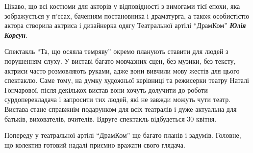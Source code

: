 Цікаво, що всі костюми для акторів у відповідності з вимогами тієї епохи, яка
зображується у п'єсах, баченням постановника і драматурга, а також особистістю
актора створила актриса і дизайнерка одягу Театральної артілі \enquote{ДрамКом} \textbf{\emph{Юлія
Корсун}}.


Спектакль \enquote{Та, що осяяла темряву} окремо планують ставити для людей з
порушенням слуху. У виставі багато мовчазних сцен, без музики, без тексту,
актриси часто розмовляють руками, адже вони вивчили мову жестів для цього
спектаклю. Саме тому, на думку художньої керівниці та режисерки театру Наталі
Гончарової, після декількох вистав вони хочуть долучити до роботи
сурдоперекладача і запросити тих людей, які не завжди можуть чути театр.
Вистава стане справжнім подарунком для всіх театралів і дуже актуальна для
батьків, вихователів, вчителів. Вдруге спектакль відбудеться 30 квітня.

Попереду у театральної артілі \enquote{ДрамКом} ще багато планів і задумів. Головне, що
колектив готовий надалі приємно вражати свого глядача.
